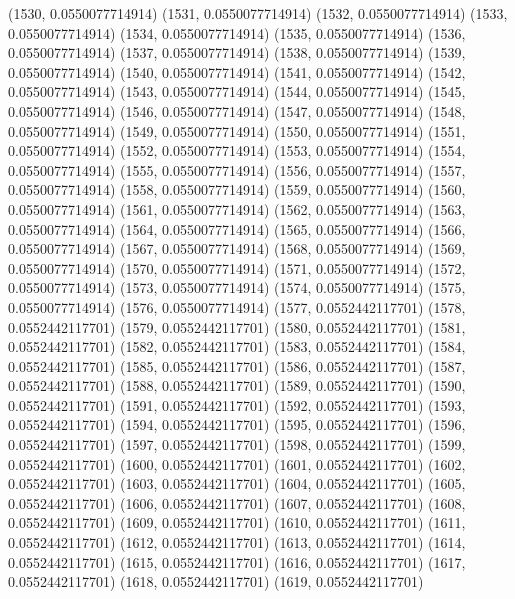 {					(1530, 0.0550077714914)
					(1531, 0.0550077714914)
					(1532, 0.0550077714914)
					(1533, 0.0550077714914)
					(1534, 0.0550077714914)
					(1535, 0.0550077714914)
					(1536, 0.0550077714914)
					(1537, 0.0550077714914)
					(1538, 0.0550077714914)
					(1539, 0.0550077714914)
					(1540, 0.0550077714914)
					(1541, 0.0550077714914)
					(1542, 0.0550077714914)
					(1543, 0.0550077714914)
					(1544, 0.0550077714914)
					(1545, 0.0550077714914)
					(1546, 0.0550077714914)
					(1547, 0.0550077714914)
					(1548, 0.0550077714914)
					(1549, 0.0550077714914)
					(1550, 0.0550077714914)
					(1551, 0.0550077714914)
					(1552, 0.0550077714914)
					(1553, 0.0550077714914)
					(1554, 0.0550077714914)
					(1555, 0.0550077714914)
					(1556, 0.0550077714914)
					(1557, 0.0550077714914)
					(1558, 0.0550077714914)
					(1559, 0.0550077714914)
					(1560, 0.0550077714914)
					(1561, 0.0550077714914)
					(1562, 0.0550077714914)
					(1563, 0.0550077714914)
					(1564, 0.0550077714914)
					(1565, 0.0550077714914)
					(1566, 0.0550077714914)
					(1567, 0.0550077714914)
					(1568, 0.0550077714914)
					(1569, 0.0550077714914)
					(1570, 0.0550077714914)
					(1571, 0.0550077714914)
					(1572, 0.0550077714914)
					(1573, 0.0550077714914)
					(1574, 0.0550077714914)
					(1575, 0.0550077714914)
					(1576, 0.0550077714914)
					(1577, 0.0552442117701)
					(1578, 0.0552442117701)
					(1579, 0.0552442117701)
					(1580, 0.0552442117701)
					(1581, 0.0552442117701)
					(1582, 0.0552442117701)
					(1583, 0.0552442117701)
					(1584, 0.0552442117701)
					(1585, 0.0552442117701)
					(1586, 0.0552442117701)
					(1587, 0.0552442117701)
					(1588, 0.0552442117701)
					(1589, 0.0552442117701)
					(1590, 0.0552442117701)
					(1591, 0.0552442117701)
					(1592, 0.0552442117701)
					(1593, 0.0552442117701)
					(1594, 0.0552442117701)
					(1595, 0.0552442117701)
					(1596, 0.0552442117701)
					(1597, 0.0552442117701)
					(1598, 0.0552442117701)
					(1599, 0.0552442117701)
					(1600, 0.0552442117701)
					(1601, 0.0552442117701)
					(1602, 0.0552442117701)
					(1603, 0.0552442117701)
					(1604, 0.0552442117701)
					(1605, 0.0552442117701)
					(1606, 0.0552442117701)
					(1607, 0.0552442117701)
					(1608, 0.0552442117701)
					(1609, 0.0552442117701)
					(1610, 0.0552442117701)
					(1611, 0.0552442117701)
					(1612, 0.0552442117701)
					(1613, 0.0552442117701)
					(1614, 0.0552442117701)
					(1615, 0.0552442117701)
					(1616, 0.0552442117701)
					(1617, 0.0552442117701)
					(1618, 0.0552442117701)
					(1619, 0.0552442117701)
}
